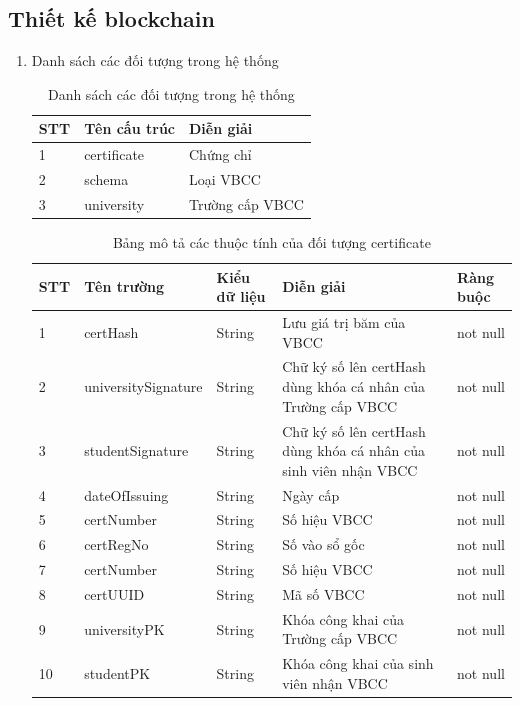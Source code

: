 \subsection{Thiết kế blockchain}
\begin{enumerate}
\item 
Danh sách các đối tượng trong hệ thống


\begin{table}[H]
\caption{Danh sách các đối tượng trong hệ thống}
	\label{table:asset}
	\begin{tabularx} {\textwidth} {|p{1cm}|p{3cm}|X|}
\hline
		STT &	Tên cấu trúc &  Diễn giải \\ \hline
		1 & certificate	& Chứng chỉ  \\ \hline
		2 & schema  &  Loại VBCC  \\ \hline
		3 & university	&  Trường cấp VBCC  \\ \hline
\end{tabularx}
\end{table}

\begin{table}[H]
\caption{Bảng mô tả các thuộc tính của đối tượng certificate}
	\label{table:assetcertificate}
	\begin{tabularx} {\textwidth} {|p{0.8cm}|p{3.5cm}|p{2.5cm}|X|p{2cm}|}
\hline
		STT &	Tên trường & Kiểu dữ liệu & Diễn giải & Ràng buộc \\ \hline
		1 & certHash	& String & Lưu giá trị băm của VBCC  & not null \\ \hline
		2 & universitySignature & String  & Chữ ký số lên certHash dùng khóa cá nhân của Trường cấp VBCC  & not null \\ \hline
		3 & studentSignature	&  String & Chữ ký số lên certHash dùng khóa cá nhân của sinh viên nhận VBCC  & not null\\ \hline
		4 & dateOfIssuing	& String & Ngày cấp  &not null \\ \hline
		5 & certNumber	& String & Số hiệu VBCC  & not null\\ \hline
		6 & certRegNo	& String & Số vào sổ gốc  & not null\\ \hline
		7 & certNumber	& String & Số hiệu VBCC  & not null\\ \hline
		8 & certUUID	& String & Mã số VBCC  & not null\\ \hline
		9 & universityPK	& String & Khóa công khai của Trường cấp VBCC  &not null \\ \hline
		10 & studentPK	& String & Khóa công khai của sinh viên nhận VBCC  &not null \\ \hline
\end{tabularx}
\end{table}



\end{enumerate}
